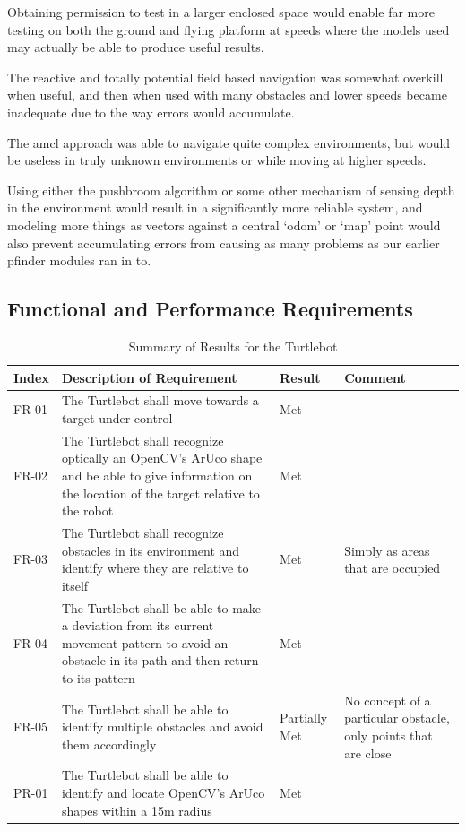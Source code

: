 \documentclass{article}[12]
\begin{document}
Obtaining permission to test in a larger enclosed space would enable far more testing on both the ground and flying platform at speeds where the models used may actually be able to produce useful results. 

The reactive and totally potential field based navigation was somewhat overkill when useful, and then when used with many obstacles and lower speeds became inadequate due to the way errors would accumulate.

The amcl approach was able to navigate quite complex environments, but would be useless in truly unknown environments or while moving at higher speeds. 

Using either the pushbroom algorithm or some other mechanism of sensing depth in the environment would result in a significantly more reliable system, and modeling more things as vectors against a central `odom' or `map' point would also prevent accumulating errors from causing as many problems as our earlier pfinder modules ran in to.
 
 \subsection{Functional and Performance Requirements}

	\begin{table}[H]
  \small
		\begin{tabular}{p{2cm} p{8cm} p{2cm} p{3cm}} 
			\hline
			{\textbf{Index}} & {\textbf{Description of Requirement}} & {\textbf{Result}} & {\textbf{Comment}} \\ \hline
FR-01 & The Turtlebot shall move towards a target under control & Met & \\
FR-02 & The Turtlebot shall recognize optically an OpenCV's ArUco shape and be able to give information on the location of the target relative to the robot & Met & \\
FR-03 & The Turtlebot shall recognize obstacles in its environment and identify where they are relative to itself & Met & Simply as areas that are occupied \\
FR-04 & The Turtlebot shall be able to make a deviation from its current movement pattern to avoid an obstacle in its path and then return to its pattern & Met & \\
FR-05 & The Turtlebot shall be able to identify multiple obstacles and avoid them accordingly & Partially Met & No concept of a particular obstacle, only points that are close \\
PR-01 & The Turtlebot shall be able to identify and locate OpenCV's ArUco shapes within a 15m radius & Met & \\ \hline
     \end{tabular}
     \caption{Summary of Results for the Turtlebot}
     \label{table:turtlbotresults}
 \end{table}
\end{document}
